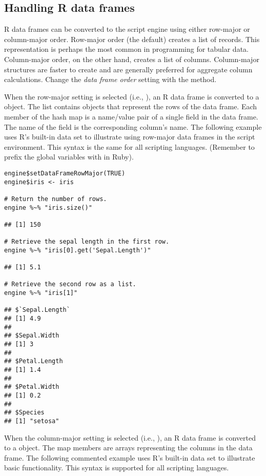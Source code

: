 \hypertarget{handlingrdataframes}{\subsection{Handling R data frames}}

R data frames can be converted to the script engine using either row-major or column-major order. Row-major order (the default) creates a list of records. This representation is perhaps the most common in programming for tabular data. Column-major order, on the other hand, creates a list of columns. Column-major structures are faster to create and are generally preferred for aggregate column calculations. Change the \textit{data frame order} setting with the  method.

When the row-major setting is selected (i.e., ), an R data frame is converted to a \href{https://docs.oracle.com/javase/8/docs/api/java/util/ArrayList.html}{} object. The list contains  \href{https://docs.oracle.com/javase/8/docs/api/java/util/HashMap.html}{} objects that represent the rows of the data frame. Each member of the hash map is a name/value pair of a single field in the data frame. The name of the field is the corresponding column's name. The following example uses R's built-in  data set to illustrate using row-major data frames in the script environment. This syntax is the same for all scripting languages. (Remember to prefix the global variables with \code{\$} in Ruby).

\begin{verbatim}
engine$setDataFrameRowMajor(TRUE)
engine$iris <- iris

# Return the number of rows.
engine %~% "iris.size()"

## [1] 150

# Retrieve the sepal length in the first row.
engine %~% "iris[0].get('Sepal.Length')"

## [1] 5.1

# Retrieve the second row as a list.
engine %~% "iris[1]"

## $`Sepal.Length`
## [1] 4.9
## 
## $Sepal.Width
## [1] 3
## 
## $Petal.Length
## [1] 1.4
## 
## $Petal.Width
## [1] 0.2
## 
## $Species
## [1] "setosa"
\end{verbatim}

When the column-major setting is selected (i.e., ), an R data frame is converted to a \href{https://docs.oracle.com/javase/8/docs/api/java/util/HashMap.html}{} object. The map members are arrays representing the columns in the data frame. The following commented example uses R's built-in  data set to illustrate basic functionality. This syntax is supported for all scripting languages.

